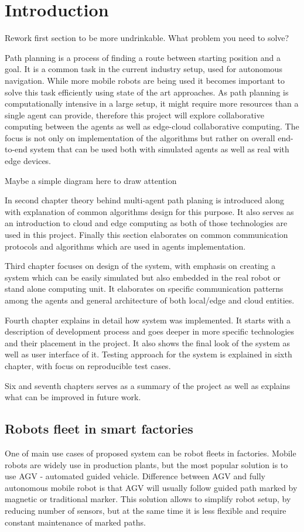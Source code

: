 \chapter{Introduction}
{\color{red}Rework first section to be more undrinkable. What problem you need to solve? }

Path planning is a process of finding a route between starting position and a goal. It is a common task in the current industry setup, used for autonomous navigation. While more mobile robots are being used it becomes important to solve this task efficiently using state of the art approaches. As path planning is computationally intensive in a large setup, it might require more resources than a single agent can provide, therefore this project will explore collaborative computing between the agents as well as edge-cloud collaborative computing. The focus is not only on implementation of the algorithms but rather on overall end-to-end system that can be used both with simulated agents as well as real with edge devices.

{\color{red}Maybe a simple diagram here to draw attention}


In second chapter theory behind multi-agent path planing is introduced along with explanation of common algorithms design for this purpose. It also serves as an introduction to cloud and edge computing as both of those technologies are used in this project. Finally this section elaborates on common communication protocols and algorithms which are used in agents implementation.

Third chapter focuses on design of the system, with emphasis on creating a system which can be easily simulated but also embedded in the real robot or stand alone computing unit. It elaborates on specific communication patterns among the agents and general architecture of both local/edge and cloud entities.

Fourth chapter explains in detail how system was implemented. It starts with a description of development process and goes deeper in more specific technologies and their placement in the project. It also shows the final look of the system as well as user interface of it. Testing approach for the system is explained in sixth chapter, with focus on reproducible test cases.

Six and  seventh chapters serves as a summary of the project as well as explains what can be improved in future work.

\section{Robots fleet in smart factories}
One of main use cases of proposed system can be robot fleets in factories. Mobile robots are widely use in production plants, but the most popular solution is to use AGV - automated guided vehicle\cite{agv}. Difference between AGV and fully autonomous mobile robot is that AGV will usually follow guided path marked by magnetic or traditional marker. This solution allows to simplify robot setup, by reducing number of sensors, but at the same time it is less flexible and require constant maintenance of marked paths.

